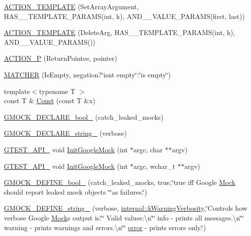 \begin{DoxyCompactItemize}
\item 
\hyperlink{namespacetesting_a2b0f090219db3bb0630d5ce6f7d911d8}{A\+C\+T\+I\+O\+N\+\_\+\+T\+E\+M\+P\+L\+A\+TE} (Set\+Array\+Argument, H\+A\+S\+\_\+\_\+\+T\+E\+M\+P\+L\+A\+T\+E\+\_\+\+P\+A\+R\+A\+MS(int, k), A\+N\+D\+\_\+\_\+\+V\+A\+L\+U\+E\+\_\+\+P\+A\+R\+A\+MS(first, last))
\item 
\hyperlink{namespacetesting_a37a5ebfe68fd8dedf8bd82a5ebddcb7b}{A\+C\+T\+I\+O\+N\+\_\+\+T\+E\+M\+P\+L\+A\+TE} (Delete\+Arg, H\+A\+S\+\_\+\_\+\+T\+E\+M\+P\+L\+A\+T\+E\+\_\+\+P\+A\+R\+A\+MS(int, k), A\+N\+D\+\_\+\_\+\+V\+A\+L\+U\+E\+\_\+\+P\+A\+R\+A\+MS())
\item 
\hyperlink{namespacetesting_a3d58f0d746946064154cd257d368599d}{A\+C\+T\+I\+O\+N\+\_\+P} (Return\+Pointee, pointer)
\item 
\hyperlink{namespacetesting_a25b4065291778029b6311f07c2fc9cc3}{M\+A\+T\+C\+H\+ER} (Is\+Empty, negation?\char`\"{}isn\textquotesingle{}t empty\char`\"{}\+:\char`\"{}is empty\char`\"{})
\item 
{\footnotesize template$<$typename T $>$ }\\const T \& \hyperlink{namespacetesting_a945ac56c5508a3c9c032bbe8aae8dcfa}{Const} (const T \&x)
\item 
\hyperlink{namespacetesting_a9dd7591091234b86ce48ce1aff6feeb5}{G\+M\+O\+C\+K\+\_\+\+D\+E\+C\+L\+A\+R\+E\+\_\+bool\+\_\+} (catch\+\_\+leaked\+\_\+mocks)
\item 
\hyperlink{namespacetesting_a4dd099d1d538f26a16fcc2f94011b37e}{G\+M\+O\+C\+K\+\_\+\+D\+E\+C\+L\+A\+R\+E\+\_\+string\+\_\+} (verbose)
\item 
\hyperlink{gtest-port_8h_aa73be6f0ba4a7456180a94904ce17790}{G\+T\+E\+S\+T\+\_\+\+A\+P\+I\+\_\+} void \hyperlink{namespacetesting_a32b1c6db9ba5133ccabfa67616b3c041}{Init\+Google\+Mock} (int $\ast$argc, char $\ast$$\ast$argv)
\item 
\hyperlink{gtest-port_8h_aa73be6f0ba4a7456180a94904ce17790}{G\+T\+E\+S\+T\+\_\+\+A\+P\+I\+\_\+} void \hyperlink{namespacetesting_a20fb86152763dddef67bc1dd8b090800}{Init\+Google\+Mock} (int $\ast$argc, wchar\+\_\+t $\ast$$\ast$argv)
\item 
\hyperlink{namespacetesting_ac4efd3cec9fd78f180d825c1d178b970}{G\+M\+O\+C\+K\+\_\+\+D\+E\+F\+I\+N\+E\+\_\+bool\+\_\+} (catch\+\_\+leaked\+\_\+mocks, true,\char`\"{}true iff Google \hyperlink{classtesting_1_1_mock}{Mock} should report leaked mock objects \char`\"{}\char`\"{}as failures.\char`\"{})
\item 
\hyperlink{namespacetesting_a17cbc94a0a3ef8fdf7d58fc5dcdcce2a}{G\+M\+O\+C\+K\+\_\+\+D\+E\+F\+I\+N\+E\+\_\+string\+\_\+} (verbose, \hyperlink{namespacetesting_1_1internal_ad9386ccda6b6deac2f7b84784d3088c0}{internal\+::k\+Warning\+Verbosity},\char`\"{}Controls how verbose Google \hyperlink{classtesting_1_1_mock}{Mock}\textquotesingle{}s output is.\char`\"{}\char`\"{}  Valid values\+:\textbackslash{}n\char`\"{}\char`\"{}  info    -\/ prints all messages.\textbackslash{}n\char`\"{}\char`\"{}  warning -\/ prints warnings and errors.\textbackslash{}n\char`\"{}\char`\"{}  \hyperlink{_07copy_08_2_read_camera_model_8m_ac546fdc9911f4a876dbfaffbc7426f8b}{error}   -\/ prints errors only.\char`\"{})

\end{DoxyCompactItemize}
